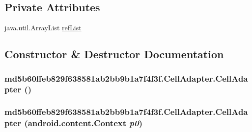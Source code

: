 \subsection*{Private Attributes}
\begin{CompactItemize}
\item 
java.util.ArrayList \hyperlink{classmd5b60ffeb829f638581ab2bb9b1a7f4f3f_1_1_cell_adapter_954a374de657ac52ab7febec23bbae94}{refList}
\end{CompactItemize}


\subsection{Constructor \& Destructor Documentation}
\hypertarget{classmd5b60ffeb829f638581ab2bb9b1a7f4f3f_1_1_cell_adapter_11e7e08e3dca364c58b1875ad43bd0ef}{
\subsubsection[{CellAdapter}]{\setlength{\rightskip}{0pt plus 5cm}md5b60ffeb829f638581ab2bb9b1a7f4f3f.CellAdapter.CellAdapter ()}}
\label{classmd5b60ffeb829f638581ab2bb9b1a7f4f3f_1_1_cell_adapter_11e7e08e3dca364c58b1875ad43bd0ef}


\hypertarget{classmd5b60ffeb829f638581ab2bb9b1a7f4f3f_1_1_cell_adapter_cc33c5de6c2168e85cfed4b8b631a7f7}{
\subsubsection[{CellAdapter}]{\setlength{\rightskip}{0pt plus 5cm}md5b60ffeb829f638581ab2bb9b1a7f4f3f.CellAdapter.CellAdapter (android.content.Context {\em p0})}}
\label{classmd5b60ffeb829f638581ab2bb9b1a7f4f3f_1_1_cell_adapter_cc33c5de6c2168e85cfed4b8b631a7f7}




